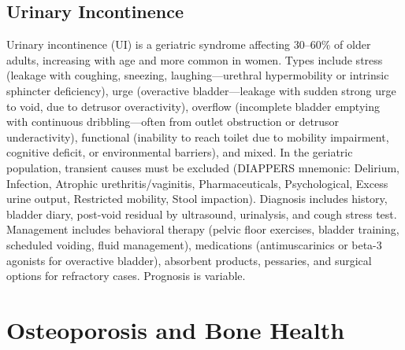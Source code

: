 \subsection{Urinary Incontinence}
\label{sec:geriatric:Urinary Incontinence}
Urinary incontinence (UI) is a geriatric syndrome affecting 30--60\% of older adults, increasing with age and more common in women. Types include stress (leakage with coughing, sneezing, laughing---urethral hypermobility or intrinsic sphincter deficiency), urge (overactive bladder---leakage with sudden strong urge to void, due to detrusor overactivity), overflow (incomplete bladder emptying with continuous dribbling---often from outlet obstruction or detrusor underactivity), functional (inability to reach toilet due to mobility impairment, cognitive deficit, or environmental barriers), and mixed. In the geriatric population, transient causes must be excluded (DIAPPERS mnemonic: Delirium, Infection, Atrophic urethritis/vaginitis, Pharmaceuticals, Psychological, Excess urine output, Restricted mobility, Stool impaction). Diagnosis includes history, bladder diary, post-void residual by ultrasound, urinalysis, and cough stress test. Management includes behavioral therapy (pelvic floor exercises, bladder training, scheduled voiding, fluid management), medications (antimuscarinics or beta-3 agonists for overactive bladder), absorbent products, pessaries, and surgical options for refractory cases. Prognosis is variable.

\section{Osteoporosis and Bone Health}








